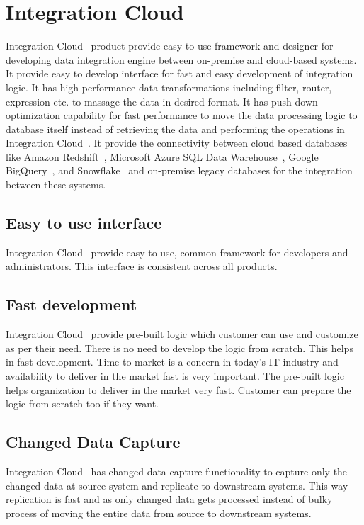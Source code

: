 \section{Integration Cloud}

Integration Cloud~\cite{hid-sp18-511-iics} product provide easy to use
framework and designer for developing data integration engine between on-premise
and cloud-based systems. It provide easy to develop interface for fast and easy development of integration logic. It has high performance data transformations including filter, router, expression etc. to massage the data in desired format. It has push-down optimization
capability for fast performance to move the data processing logic to database itself
instead of retrieving the data and performing the operations in Integration Cloud~\cite{hid-sp18-511-iics}. It provide the
connectivity between cloud based databases like Amazon
Redshift~\cite{hid-sp18-511-aws-redshift}, Microsoft Azure SQL Data
Warehouse~\cite{hid-sp18-511-ms-azure-sql}, Google
BigQuery~\cite{hid-sp18-511-google-bigquery}, and
Snowflake~\cite{hid-sp18-511-snowflake} and on-premise legacy databases for the integration between these systems.

\subsection{Easy to use interface}
Integration Cloud~\cite{hid-sp18-511-iics} provide easy to use, common framework for developers and administrators. This interface is consistent across all products.

\subsection{Fast development}
Integration Cloud~\cite{hid-sp18-511-iics} provide pre-built logic which customer can use and customize as per their need. There is no need to develop the logic from scratch. This helps in fast development. Time to market is a concern in today's IT industry and availability to deliver in the market fast is very important. The pre-built logic helps organization to deliver in the market very fast. Customer can prepare the logic from scratch too if they want. 

\subsection{Changed Data Capture}

Integration Cloud~\cite{hid-sp18-511-iics} has changed data capture functionality to capture only the changed data at source system and replicate to downstream systems. This way replication is fast and as only changed data gets processed instead of bulky process of moving the entire data from source to downstream systems.


